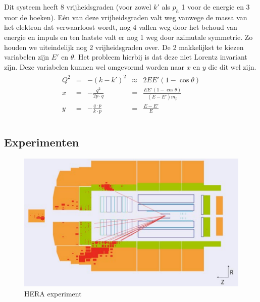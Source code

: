 \documentclass[../main.tex]{subfiles}
\begin{document}
Dit systeem heeft 8 vrijheidsgraden (voor zowel $k'$ als $p_h$ 1 voor de energie en 3 voor de hoeken). Eén van deze vrijheidsgraden valt weg vanwege de massa van het elektron dat verwaarloost wordt, nog 4 vallen weg door het behoud van energie en impuls en ten laatste valt er nog 1 weg door azimutale symmetrie. Zo houden we uiteindelijk nog 2 vrijheidsgraden over. De 2 makkelijkst te kiezen variabelen zijn $E'$ en $\theta$. Het probleem hierbij is dat deze niet Lorentz invariant zijn. Deze variabelen kunnen wel omgevormd worden naar $x$ en $y$ die dit wel zijn.
\begin{equation}
    \begin{aligned}
        \label{eq:etheta_naanr_xy}
        \begin{matrix}
            Q^2 & = & -(k-k')^2                 & \approx   & 2EE'(1-\cos\theta) \\
            x   & = & -\frac{q^2}{2p\cdot q}    & =         & \frac{EE'(1-\cos\theta)}{(E-E')m_p} \\
            y   & = & -\frac{q\cdot p}{k\cdot p}& =         & \frac{E-E'}{E} \\
        \end{matrix}
    \end{aligned}
\end{equation}

\subsection{Experimenten}%
\label{sub:experimenten}

\begin{figure}[h]
    \centering
    \includegraphics[width=0.6\linewidth]{DIS_nucleon_structuur_pdf/hera.png}
    \caption{HERA experiment}%
    \label{fig:hera}
\end{figure}
\end{document}
